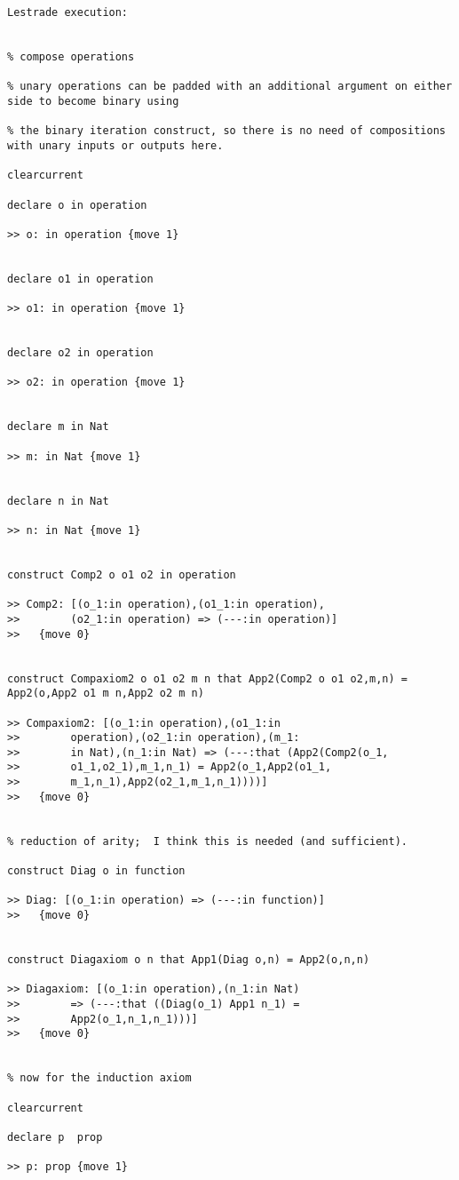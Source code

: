 \documentclass[12pt]{article}
\begin{document}
\begin{verbatim}Lestrade execution:


% compose operations

% unary operations can be padded with an additional argument on either side to become binary using

% the binary iteration construct, so there is no need of compositions with unary inputs or outputs here.

clearcurrent

declare o in operation

>> o: in operation {move 1}


declare o1 in operation

>> o1: in operation {move 1}


declare o2 in operation

>> o2: in operation {move 1}


declare m in Nat

>> m: in Nat {move 1}


declare n in Nat

>> n: in Nat {move 1}


construct Comp2 o o1 o2 in operation

>> Comp2: [(o_1:in operation),(o1_1:in operation),
>>        (o2_1:in operation) => (---:in operation)]
>>   {move 0}


construct Compaxiom2 o o1 o2 m n that App2(Comp2 o o1 o2,m,n) = App2(o,App2 o1 m n,App2 o2 m n)

>> Compaxiom2: [(o_1:in operation),(o1_1:in 
>>        operation),(o2_1:in operation),(m_1:
>>        in Nat),(n_1:in Nat) => (---:that (App2(Comp2(o_1,
>>        o1_1,o2_1),m_1,n_1) = App2(o_1,App2(o1_1,
>>        m_1,n_1),App2(o2_1,m_1,n_1))))]
>>   {move 0}


% reduction of arity;  I think this is needed (and sufficient).

construct Diag o in function

>> Diag: [(o_1:in operation) => (---:in function)]
>>   {move 0}


construct Diagaxiom o n that App1(Diag o,n) = App2(o,n,n)

>> Diagaxiom: [(o_1:in operation),(n_1:in Nat) 
>>        => (---:that ((Diag(o_1) App1 n_1) = 
>>        App2(o_1,n_1,n_1)))]
>>   {move 0}


% now for the induction axiom

clearcurrent

declare p  prop

>> p: prop {move 1}



\end{verbatim}
\end{document}
